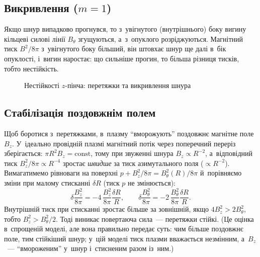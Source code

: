 \subsection*{Викривлення (\texorpdfstring{$m=1$}{m = 1})}

Якщо шнур випадково прогнувся, то з~увігнутого (внутрішнього) боку вигину кільцеві силові лінії $B_\theta$ згущуються,
а~з~опуклого розріджуються. Магнітний тиск $B^2/8\pi$ з~увігнутого боку більший, він штовхає шнур ще далі в~бік опуклості,
і~вигин наростає: що сильніше прогин, то більша різниця тисків, тобто нестійкість.

\begin{figure}[ht]\centering
	\caption{Нестійкості $z$-пінча: перетяжки та викривлення шнура}
	\label{pic:pinch-instability}
\end{figure}

\subsection*{Стабілізація поздовжнім полем}

Щоб боротися з~перетяжками, в~плазму \enquote{вморожують} поздовжнє магнітне поле $B_z$.
У~ідеально провідній плазмі магнітний потік через поперечний переріз зберігається: $\pi
R^2B_z=\mathrm{const}$, тому при звуженні шнура $B_z\propto R^{-2}$, а~відповідний тиск
$B_z^2/8\pi\propto R^{-4}$ зростає \emph{швидше} за тиск азимутального поля ($\propto
R^{-2}$). Вимагатимемо рівноваги на поверхні $p+B_z^2/8\pi=B_\theta^2(R)/8\pi$
й~порівняємо зміни при малому стисканні $\delta R$ (тиск $p$ не змінюється):
\begin{equation*}
	\delta\frac{B_z^2}{8\pi}=-4\,\frac{B_z^2}{8\pi}\frac{\delta R}R,\qquad
	\delta\frac{B_\theta^2}{8\pi}=-2\,\frac{B_\theta^2}{8\pi}\frac{\delta R}R.
\end{equation*}
Внутрішній тиск при стисканні зростає більше за зовнішній, якщо $4B_z^2>2B_\theta^2$,
тобто $B_z^2>B_\theta^2/2$. Тоді виникає повертаюча сила~--- перетяжки стійкі. (Це оцінка
в~спрощеній моделі, але вона правильно передає суть: чим більше поздовжнє поле, тим
стійкіший шнур; у~цій моделі тиск плазми вважається незмінним, а~$B_z$~--- \enquote{вмороженим} у~шнур і~стисненим разом із~ним.)

